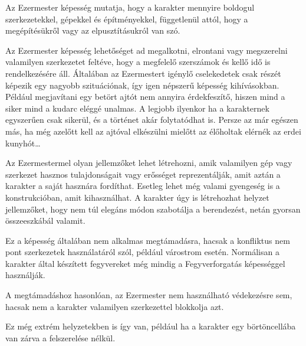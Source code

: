 
Az Ezermester képesség mutatja, hogy a karakter mennyire boldogul szerkezetekkel, gépekkel és építményekkel, függetlenül attól, hogy a megépítésükről vagy az elpusztításukról van szó.

\overcome Az Ezermester képesség lehetőséget ad megalkotni, elrontani vagy megszerelni valamilyen szerkezetet feltéve, hogy a megfelelő szerszámok és kellő idő is rendelkezésére áll. Általában az Ezermestert igénylő cselekedetek csak részét képezik egy nagyobb szituációnak, így igen népszerű képesség kihívásokban. Például megjavítani egy betört ajtót nem annyira érdekfeszítő, hiszen mind a siker mind a kudarc eléggé unalmas. A legjobb ilyenkor ha a karakternek egyszerűen csak sikerül, és a történet akár folytatódhat is. Persze az már egészen más, ha még azelőtt kell az ajtóval elkészülni mielőtt az élőholtak elérnék az erdei kunyhót…

\advantage Az Ezermestermel olyan jellemzőket lehet létrehozni, amik valamilyen gép vagy szerkezet hasznos tulajdonságait vagy erősséget reprezentálják, amit aztán a karakter a saját hasznára fordíthat. Esetleg lehet még valami gyengeség is a konstrukcióban, amit kihasználhat. A karakter úgy is létrehozhat helyzet jellemzőket, hogy nem túl elegáns módon szabotálja a berendezést, netán gyorsan összeeszkábál valamit.

\attack Ez a képesség általában nem alkalmas megtámadásra, hacsak a konfliktus nem pont szerkezetek használatáról szól, például várostrom esetén. Normálisan a karakter által készített fegyvereket még mindig a Fegyverforgatás képességgel használják.

 A megtámadáshoz hasonlóan, az Ezermester nem használható védekezésre sem, hacsak nem a karakter valamilyen szerkezettel blokkolja azt.


Ez még extrém helyzetekben is így van, például ha a karakter egy börtöncellába van zárva a felszerelése nélkül.


